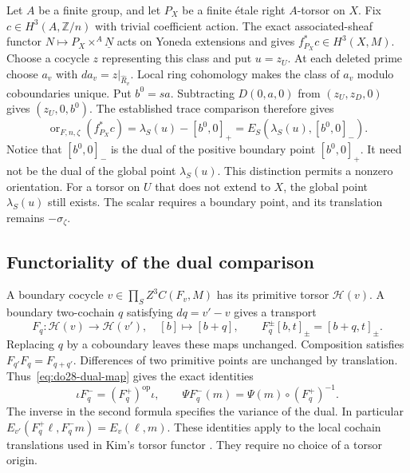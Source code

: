 Let \(A\) be a finite group, and let \(P_X\) be a finite \'etale
right \(A\)-torsor on \(X\). Fix \(c\in H^3(A,\mathbb Z/n)\)
with trivial coefficient action. The exact associated-sheaf functor
\(N\mapsto P_X\times^A\underline N\) acts on Yoneda extensions
and gives \(f_{P_X}^*c\in H^3(X,M)\).
Choose a cocycle \(z\) representing this class and put \(u=z_U\).
At each deleted prime choose \(a_v\) with
\(da_v=z|_{\widehat R_v}\). Local ring cohomology makes the
class of \(a_v\) modulo coboundaries unique. Put \(b^0=sa\).
Subtracting \(D(0,a,0)\) from \((z_U,z_D,0)\) gives
\((z_U,0,b^0)\). The established trace comparison therefore gives
\begin{equation}
\label{eq:do28-unramified-orientation}
 \operatorname{or}_{F,n,\zeta}(f_{P_X}^*c)
   =\lambda_S(u)-[b^0,0]_+
   =E_S(\lambda_S(u),[b^0,0]_-).
\end{equation}
Notice that \([b^0,0]_-\) is the dual of the positive boundary
point \([b^0,0]_+\). It need not be the dual of the global point
\(\lambda_S(u)\). This distinction permits a nonzero orientation.
For a torsor on \(U\) that does not extend to \(X\), the global
point \(\lambda_S(u)\) still exists. The scalar requires a boundary
point, and its translation remains \(-\sigma_\zeta\).

\subsection{Functoriality of the dual comparison}
\label{sec:do28-functoriality}

A boundary cocycle \(v\in\prod_S Z^3C(F_v,M)\) has its primitive
torsor \(\mathcal H(v)\). A boundary two-cochain \(q\) satisfying
\(dq=v'-v\) gives a transport
\[
 F_q:\mathcal H(v)\longrightarrow\mathcal H(v'),
 \quad[b]\longmapsto[b+q],\qquad
 F_q^\pm[b,t]_\pm=[b+q,t]_\pm.
\]
Replacing \(q\) by a coboundary leaves these maps unchanged.
Composition satisfies \(F_{q'}F_q=F_{q+q'}\).
Differences of two primitive points are unchanged by translation.
Thus~\eqref{eq:do28-dual-map} gives the exact identities
\begin{equation}
\label{eq:do28-functor-dual}
 \iota F_q^-=(F_q^+)^{\mathrm{op}}\iota,
 \qquad
 \Psi F_q^-(m)=\Psi(m)\circ(F_q^+)^{-1}.
\end{equation}
The inverse in the second formula specifies the variance of the dual.
In particular
\(E_{v'}(F_q^+\ell,F_q^-m)=E_v(\ell,m)\).
These identities apply to the local cochain translations used in
Kim's torsor functor \cite[\S2, pp.~5--6]{Kim2016}.
They require no choice of a torsor origin.


